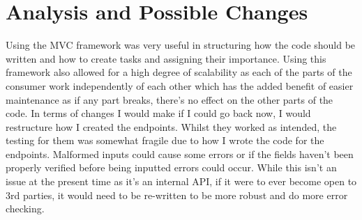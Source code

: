 \section{Analysis and Possible Changes}
Using the MVC framework was very useful in structuring how the code should be written and how to create tasks and assigning their importance.  Using this framework also allowed for a high degree of scalability as each of the parts of the consumer work independently of each other which has the added benefit of easier maintenance as if any part breaks, there's no effect on the other parts of the code.  \newline In terms of changes I would make if I could go back now, I would restructure how I created the endpoints.  Whilst they worked as intended, the testing for them was somewhat fragile due to how I wrote the code for the endpoints.  Malformed inputs could cause some errors or if the fields haven't been properly verified before being inputted errors could occur.  While this isn't an issue at the present time as it's an internal API,  if it were to ever become open to 3rd parties,  it would need to be re-written to be more robust and do more error checking.